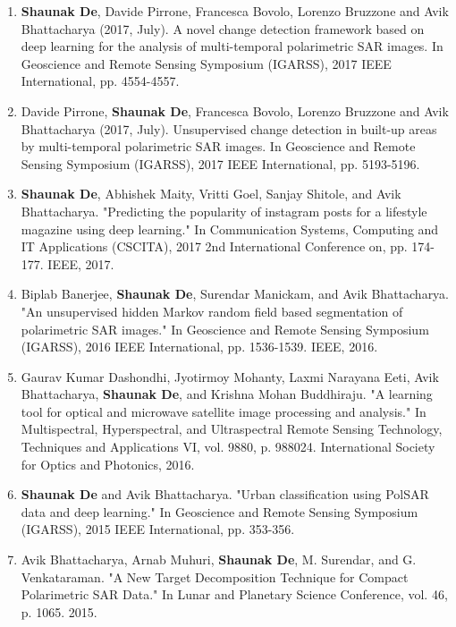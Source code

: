 \documentclass[12pt, a4paper]{article}
\begin{document}
{\small
\begin{enumerate} 

\item {}\quad \textbf{Shaunak De}, Davide Pirrone, Francesca Bovolo, Lorenzo Bruzzone and Avik Bhattacharya (2017, July). A novel change detection framework based on deep learning for the analysis of multi-temporal polarimetric SAR images. In Geoscience and Remote Sensing Symposium (IGARSS), 2017 IEEE International, pp. 4554-4557.

\item {}\quad Davide Pirrone, \textbf{Shaunak De}, Francesca Bovolo, Lorenzo Bruzzone and Avik Bhattacharya (2017, July). Unsupervised change detection in built-up areas by multi-temporal polarimetric SAR images. In Geoscience and Remote Sensing Symposium (IGARSS), 2017 IEEE International, pp. 5193-5196. 

\item \textbf{Shaunak De}, Abhishek Maity, Vritti Goel, Sanjay Shitole, and Avik Bhattacharya. "Predicting the popularity of instagram posts for a lifestyle magazine using deep learning." In Communication Systems, Computing and IT Applications (CSCITA), 2017 2nd International Conference on, pp. 174-177. IEEE, 2017.

\item {}\quad Biplab Banerjee, \textbf{Shaunak De}, Surendar Manickam, and Avik Bhattacharya. "An unsupervised hidden Markov random field based segmentation of polarimetric SAR images." In Geoscience and Remote Sensing Symposium (IGARSS), 2016 IEEE International, pp. 1536-1539. IEEE, 2016. 

\item Gaurav Kumar Dashondhi, Jyotirmoy Mohanty, Laxmi Narayana Eeti, Avik Bhattacharya, \textbf{Shaunak De}, and Krishna Mohan Buddhiraju. "A learning tool for optical and microwave satellite image processing and analysis." In Multispectral, Hyperspectral, and Ultraspectral Remote Sensing Technology, Techniques and Applications VI, vol. 9880, p. 988024. International Society for Optics and Photonics, 2016.

\item {}\quad \textbf{Shaunak De} and Avik Bhattacharya. "Urban classification using PolSAR data and deep learning." In Geoscience and Remote Sensing Symposium (IGARSS), 2015 IEEE International, pp. 353-356.  

\item Avik Bhattacharya, Arnab Muhuri, \textbf{Shaunak De}, M. Surendar, and G. Venkataraman. "A New Target Decomposition Technique for Compact Polarimetric SAR Data." In Lunar and Planetary Science Conference, vol. 46, p. 1065. 2015.


\end{enumerate}}
\end{document}
